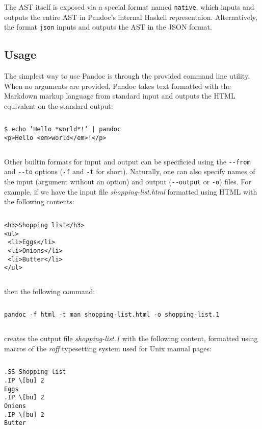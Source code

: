 \documentclass[
  digital,     %
  oneside,     %
  nosansbold,  %
  nocolorbold, %
  lof,         %
  lot,         %
]{fithesis4}
\begin{document}
The AST itself is exposed via a special format named \texttt{native}, which inputs and outputs the entire AST in Pandoc's internal Haskell representaion. Alternatively, the format \texttt{json} inputs and outputs the AST in the JSON format.

\subsection{Usage}

The simplest way to use Pandoc is through the provided command line utility. When no arguments are provided, Pandoc takes text formatted with the Markdown markup language from standard input and outputs the HTML equivalent on the standard output:

$ $

\noindent
\texttt{\$ echo 'Hello *world*!' | pandoc} \\
\texttt{<p>Hello <em>world</em>!</p>}

$ $

Other builtin formats for input and output can be specificied using the \texttt{-{}-from} and \texttt{-{}-to} options (\texttt{-f} and \texttt{-t} for short). Naturally, one can also specify names of the input (argument without an option) and output (\texttt{-{}-output} or \texttt{-o}) files. For example, if we have the input file \textit{shopping-list.html} formatted using HTML with the following contents:

$ $

\noindent
\texttt{<h3>Shopping list</h3>} \\
\texttt{<ul>} \\
\texttt{    <li>Eggs</li>} \\
\texttt{    <li>Onions</li>} \\
\texttt{    <li>Butter</li>} \\
\texttt{</ul>}

$ $

then the following command:

$ $

\noindent
\texttt{pandoc -f html -t man shopping-list.html -o shopping-list.1}

$ $

creates the output file \textit{shopping-list.1} with the following content, formatted using macros of the \textit{roff} typesetting system used for Unix manual pages:

$ $

\noindent
\texttt{.SS Shopping list} \\
\texttt{.IP \textbackslash[bu] 2} \\
\texttt{Eggs} \\
\texttt{.IP \textbackslash[bu] 2} \\
\texttt{Onions} \\
\texttt{.IP \textbackslash[bu] 2} \\
\texttt{Butter}
\end{document}
